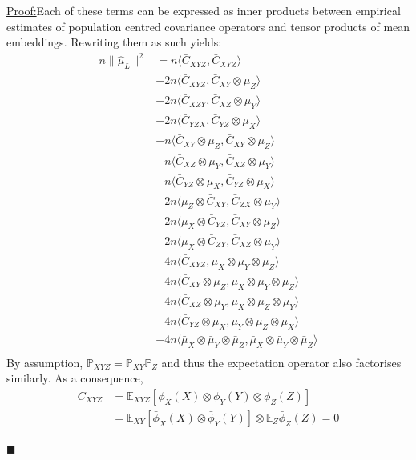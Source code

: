 \documentclass[]{article}
\newenvironment{claimproof}[1]{\par\noindent\underline{Proof:}\space#1}{\hfill $\blacksquare$}
\begin{document}
\begin{claimproof}
Each of these terms can be expressed as inner products between empirical estimates of population centred covariance operators and tensor products of mean embeddings. Rewriting them as such yields:
\begin{align*}
n\|\hat \mu_L\|^2 &= n\langle \bar{C}_{XYZ},\bar{C}_{XYZ} \rangle \\& -
2n\langle \bar{C}_{XYZ},\bar{C}_{XY}\otimes\bar{\mu}_Z \rangle \\& -
2n\langle \bar{C}_{XZY},\bar{C}_{XZ}\otimes\bar{\mu}_Y \rangle \\& -
2n\langle \bar{C}_{YZX},\bar{C}_{YZ}\otimes\bar{\mu}_X \rangle \\& +
n\langle \bar{C}_{XY}\otimes\bar{\mu}_Z,\bar{C}_{XY}\otimes\bar{\mu}_Z \rangle \\& +
n\langle \bar{C}_{XZ}\otimes\bar{\mu}_Y,\bar{C}_{XZ}\otimes\bar{\mu}_Y \rangle \\& +
n\langle \bar{C}_{YZ}\otimes\bar{\mu}_X,\bar{C}_{YZ}\otimes\bar{\mu}_X \rangle \\& +
2n\langle \bar{\mu}_Z\otimes\bar{C}_{XY},\bar{C}_{ZX}\otimes\bar{\mu}_Y \rangle \\& +
2n\langle \bar{\mu}_X\otimes\bar{C}_{YZ},\bar{C}_{XY}\otimes\bar{\mu}_Z \rangle \\& +
2n\langle \bar{\mu}_X\otimes\bar{C}_{ZY},\bar{C}_{XZ}\otimes\bar{\mu}_Y \rangle \\& +
4n\langle \bar{C}_{XYZ},\bar{\mu}_X \otimes\bar{\mu}_Y \otimes \bar{\mu}_Z \rangle \\& -
4n\langle \bar{C}_{XY}\otimes \bar{\mu}_Z,\bar{\mu}_X \otimes\bar{\mu}_Y \otimes \bar{\mu}_Z \rangle \\& -
4n\langle \bar{C}_{XZ}\otimes \bar{\mu}_Y,\bar{\mu}_X \otimes\bar{\mu}_Z \otimes \bar{\mu}_Y \rangle \\& -
4n\langle \bar{C}_{YZ}\otimes \bar{\mu}_X,\bar{\mu}_Y \otimes\bar{\mu}_Z \otimes \bar{\mu}_X \rangle \\& +
4n\langle \bar{\mu}_X \otimes\bar{\mu}_Y \otimes \bar{\mu}_Z,\bar{\mu}_X \otimes\bar{\mu}_Y \otimes \bar{\mu}_Z \rangle \\
\end{align*}
By assumption, $\mathbb{P}_{XYZ} =\mathbb{P}_{XY}\mathbb{P}_{Z}$ and thus the expectation operator also factorises similarly. As a consequence, 
\begin{align*}
C_{XYZ} &= \mathbb{E}_{XYZ}[\bar\phi_X(X)\otimes\bar\phi_Y(Y)\otimes\bar\phi_Z(Z)] \\
& = \mathbb{E}_{XY}[\bar\phi_X(X)\otimes\bar\phi_Y(Y)]\otimes\mathbb{E}_{Z}\bar\phi_Z(Z)=0
\end{align*}


\end{claimproof}
\end{document}
